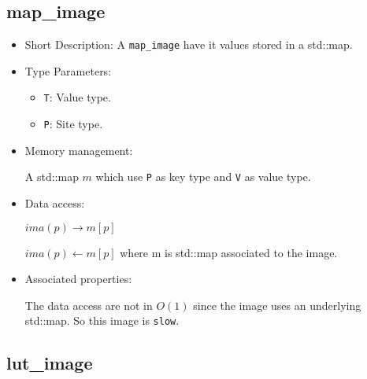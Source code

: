 
\subsection{map\_image}

\begin{itemize}

\item{Short Description:}
 A \verb+map_image+ have it values stored in a std::map.

\item{Type Parameters:}

\begin{itemize}
\item \verb+T+: Value type.
\item \verb+P+: Site type.
\end{itemize}

\item{Memory management:}

 A std::map $m$ which use \verb+P+ as key type and \verb+V+ as value type.

\item{Data access:}

$ima(p) \rightarrow m[p]$

$ima(p) \leftarrow m[p]$
where m is std::map associated to the image.


\item{Associated properties:}

The data access are not in $O(1)$ since the image uses an underlying std::map.
So this image is \verb+slow+.

\end{itemize}





\subsection{lut\_image}


